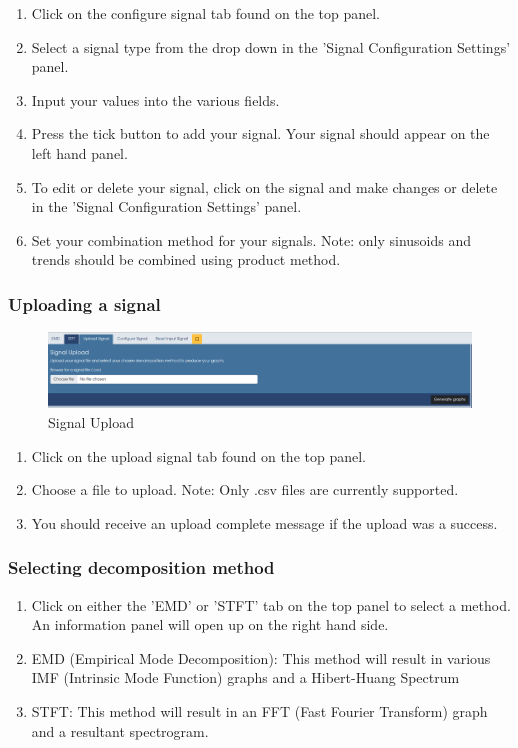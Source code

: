 \begin{enumerate}
\item Click on the configure signal tab found on the top panel.
\item Select a signal type from the drop down in the 'Signal Configuration Settings' panel.
\item Input your values into the various fields.
\item Press the tick button to add your signal. Your signal should appear on the left hand panel.
\item To edit or delete your signal, click on the signal and make changes or delete in the 'Signal Configuration Settings' panel.
\item Set your combination method for your signals. Note: only sinusoids and trends should be combined using product method.
\end{enumerate}

\subsubsection{Uploading a signal}
\begin{figure}[H]
\centering
\includegraphics[width=1.0\textwidth]{figures/signalupload.png}
\caption{\label{fig:Signal Upload}Signal Upload}
\end{figure}

\begin{enumerate}
\item Click on the upload signal tab found on the top panel.
\item Choose a file to upload. Note: Only .csv files are currently supported.
\item You should receive an upload complete message if the upload was a success.
\end{enumerate}

\subsubsection{Selecting decomposition method}
\begin{enumerate}
\item Click on either the 'EMD' or 'STFT' tab on the top panel to select a method. An information panel will open up on the right hand side.
\item EMD (Empirical Mode Decomposition): This method will result in various IMF (Intrinsic Mode Function) graphs and a Hibert-Huang Spectrum  
\item STFT: This method will result in an FFT (Fast Fourier Transform) graph and a resultant spectrogram.
\end{enumerate}

